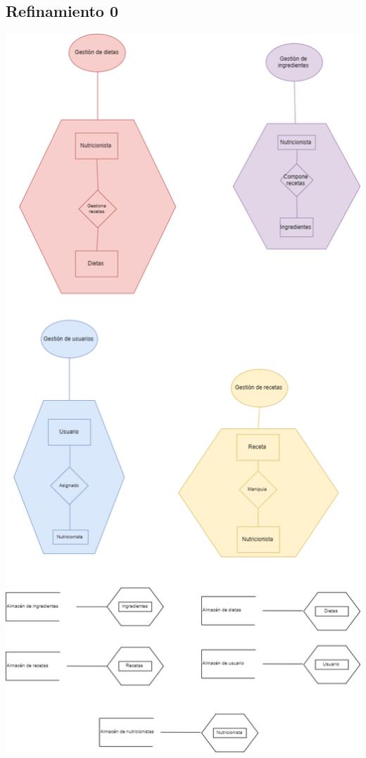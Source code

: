 \documentclass[12pt,letterpaper]{article}
\begin{document}
\subsection{Refinamiento 0}
\includegraphics[scale=0.3]{externo0.png}
\end{document}
